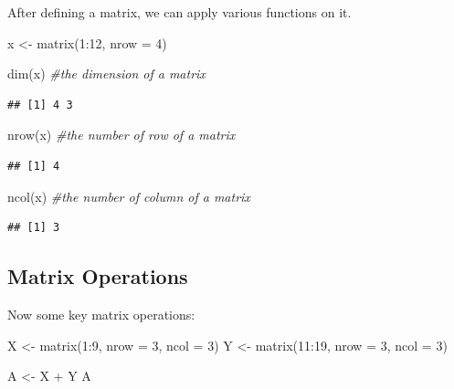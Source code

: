\documentclass[
]{book}
\newenvironment{Shaded}{\begin{snugshade}}{\end{snugshade}}
\newcommand{\AttributeTok}[1]{\textcolor[rgb]{0.77,0.63,0.00}{#1}}
\newcommand{\CommentTok}[1]{\textcolor[rgb]{0.56,0.35,0.01}{\textit{#1}}}
\newcommand{\DecValTok}[1]{\textcolor[rgb]{0.00,0.00,0.81}{#1}}
\newcommand{\FunctionTok}[1]{\textcolor[rgb]{0.00,0.00,0.00}{#1}}
\newcommand{\NormalTok}[1]{#1}
\newcommand{\OtherTok}[1]{\textcolor[rgb]{0.56,0.35,0.01}{#1}}
\newcommand{\SpecialCharTok}[1]{\textcolor[rgb]{0.00,0.00,0.00}{#1}}
\begin{document}
After defining a matrix, we can apply various functions on it.

\begin{Shaded}
\begin{Highlighting}[]
\NormalTok{x }\OtherTok{\textless{}{-}} \FunctionTok{matrix}\NormalTok{(}\DecValTok{1}\SpecialCharTok{:}\DecValTok{12}\NormalTok{, }\AttributeTok{nrow =} \DecValTok{4}\NormalTok{)}

\FunctionTok{dim}\NormalTok{(x)            }\CommentTok{\#the dimension of a matrix         }
\end{Highlighting}
\end{Shaded}

\begin{verbatim}
## [1] 4 3
\end{verbatim}

\begin{Shaded}
\begin{Highlighting}[]
\FunctionTok{nrow}\NormalTok{(x)           }\CommentTok{\#the number of row of a matrix }
\end{Highlighting}
\end{Shaded}

\begin{verbatim}
## [1] 4
\end{verbatim}

\begin{Shaded}
\begin{Highlighting}[]
\FunctionTok{ncol}\NormalTok{(x)           }\CommentTok{\#the number of column of a matrix }
\end{Highlighting}
\end{Shaded}

\begin{verbatim}
## [1] 3
\end{verbatim}

\hypertarget{matrix-operations}{%
\subsection{Matrix Operations}\label{matrix-operations}}

Now some key matrix operations:

\begin{Shaded}
\begin{Highlighting}[]
\NormalTok{X }\OtherTok{\textless{}{-}} \FunctionTok{matrix}\NormalTok{(}\DecValTok{1}\SpecialCharTok{:}\DecValTok{9}\NormalTok{, }\AttributeTok{nrow =} \DecValTok{3}\NormalTok{, }\AttributeTok{ncol =} \DecValTok{3}\NormalTok{)}
\NormalTok{Y }\OtherTok{\textless{}{-}} \FunctionTok{matrix}\NormalTok{(}\DecValTok{11}\SpecialCharTok{:}\DecValTok{19}\NormalTok{, }\AttributeTok{nrow =} \DecValTok{3}\NormalTok{, }\AttributeTok{ncol =} \DecValTok{3}\NormalTok{)}

\NormalTok{A }\OtherTok{\textless{}{-}}\NormalTok{ X }\SpecialCharTok{+}\NormalTok{ Y}
\NormalTok{A}
\end{Highlighting}
\end{Shaded}
\end{document}
